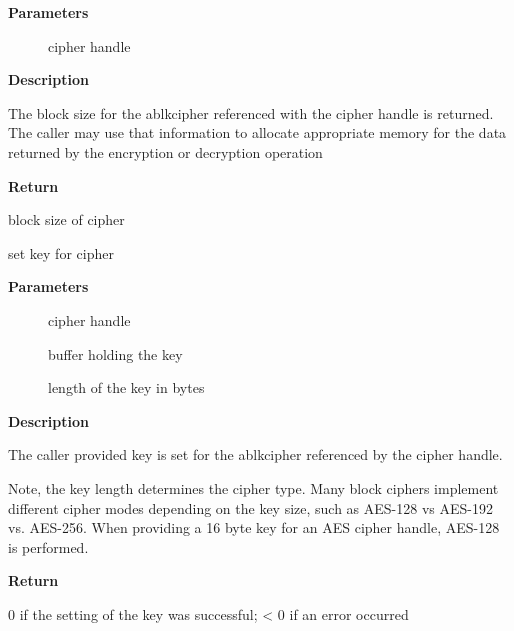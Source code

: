 \documentclass[a4paper,8pt,english]{sphinxmanual}
\begin{document}
\textbf{Parameters}
\begin{description}
\item[{}] \leavevmode
cipher handle

\end{description}

\textbf{Description}

The block size for the ablkcipher referenced with the cipher handle is
returned. The caller may use that information to allocate appropriate
memory for the data returned by the encryption or decryption operation

\textbf{Return}

block size of cipher

\begin{fulllineitems}
\label{crypto/api-skcipher:c.crypto_ablkcipher_setkey}
set key for cipher

\end{fulllineitems}


\textbf{Parameters}
\begin{description}
\item[{}] \leavevmode
cipher handle

\item[{}] \leavevmode
buffer holding the key

\item[{}] \leavevmode
length of the key in bytes

\end{description}

\textbf{Description}

The caller provided key is set for the ablkcipher referenced by the cipher
handle.

Note, the key length determines the cipher type. Many block ciphers implement
different cipher modes depending on the key size, such as AES-128 vs AES-192
vs. AES-256. When providing a 16 byte key for an AES cipher handle, AES-128
is performed.

\textbf{Return}

0 if the setting of the key was successful; \textless{} 0 if an error occurred
\end{document}
